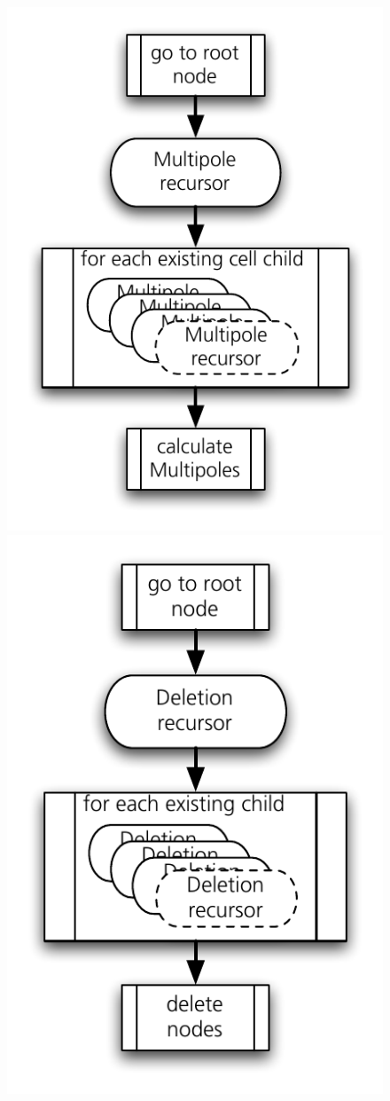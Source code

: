 \begin{figure}[htbp]
\begin{center}
\includegraphics[scale=0.6]{14algo_multipoles.pdf}
\includegraphics[scale=0.6]{15algo_treedelete.pdf}

\end{center}
\end{figure}
